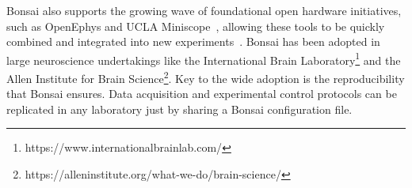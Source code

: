 Bonsai also supports the growing wave of foundational
open hardware initiatives, such as OpenEphys \citep{siegleEtAl17} and UCLA
Miniscope~\citep{caiEtAl16}, allowing these tools to be quickly combined and integrated into new experiments~\citep{buccinoEtAl18}.
%
Bonsai has been adopted in large neuroscience undertakings like the
International Brain
Laboratory\footnote{https://www.internationalbrainlab.com/}
and the Allen Institute for Brain
Science\footnote{https://alleninstitute.org/what-we-do/brain-science/}.
%
Key to the wide adoption is the reproducibility that Bonsai ensures.  Data acquisition and experimental control protocols can be 
replicated in any laboratory just by sharing a Bonsai configuration file. 
%


